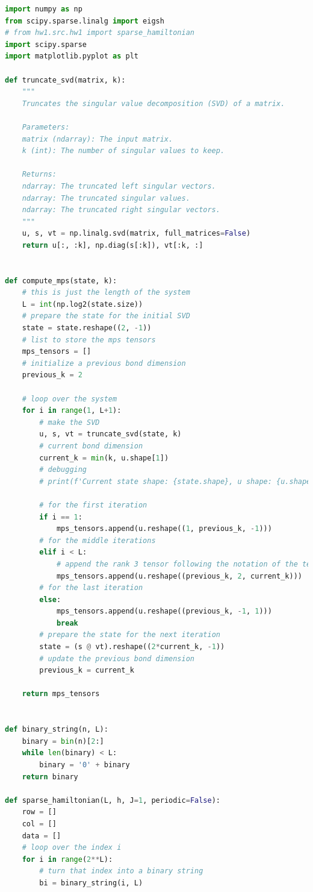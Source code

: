\documentclass[12pt]{article}
\begin{document}
\begin{lstlisting}[language=Python]
import numpy as np
from scipy.sparse.linalg import eigsh
# from hw1.src.hw1 import sparse_hamiltonian
import scipy.sparse
import matplotlib.pyplot as plt

def truncate_svd(matrix, k):
    """
    Truncates the singular value decomposition (SVD) of a matrix.

    Parameters:
    matrix (ndarray): The input matrix.
    k (int): The number of singular values to keep.

    Returns:
    ndarray: The truncated left singular vectors.
    ndarray: The truncated singular values.
    ndarray: The truncated right singular vectors.
    """
    u, s, vt = np.linalg.svd(matrix, full_matrices=False)
    return u[:, :k], np.diag(s[:k]), vt[:k, :]


def compute_mps(state, k):
    # this is just the length of the system
    L = int(np.log2(state.size))
    # prepare the state for the initial SVD
    state = state.reshape((2, -1))
    # list to store the mps tensors
    mps_tensors = []
    # initialize a previous bond dimension
    previous_k = 2

    # loop over the system
    for i in range(1, L+1):
        # make the SVD
        u, s, vt = truncate_svd(state, k)
        # current bond dimension
        current_k = min(k, u.shape[1])
        # debugging
        # print(f'Current state shape: {state.shape}, u shape: {u.shape}, s shape: {s.shape}, vt shape: {vt.shape}')

        # for the first iteration
        if i == 1:
            mps_tensors.append(u.reshape((1, previous_k, -1)))
        # for the middle iterations
        elif i < L:
            # append the rank 3 tensor following the notation of the tensor network diagrams
            mps_tensors.append(u.reshape((previous_k, 2, current_k)))
        # for the last iteration
        else:
            mps_tensors.append(u.reshape((previous_k, -1, 1)))
            break
        # prepare the state for the next iteration
        state = (s @ vt).reshape((2*current_k, -1))
        # update the previous bond dimension
        previous_k = current_k

    return mps_tensors


def binary_string(n, L):
    binary = bin(n)[2:]
    while len(binary) < L:
        binary = '0' + binary
    return binary

def sparse_hamiltonian(L, h, J=1, periodic=False):
    row = []
    col = []
    data = []
    # loop over the index i
    for i in range(2**L):
        # turn that index into a binary string
        bi = binary_string(i, L)


\end{lstlisting}
\end{document}
